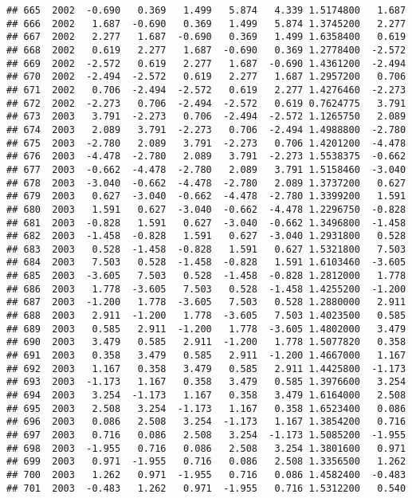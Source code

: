 \documentclass[]{article}
\begin{document}
\begin{verbatim}
## 665  2002  -0.690   0.369   1.499   5.874   4.339 1.5174800   1.687
## 666  2002   1.687  -0.690   0.369   1.499   5.874 1.3745200   2.277
## 667  2002   2.277   1.687  -0.690   0.369   1.499 1.6358400   0.619
## 668  2002   0.619   2.277   1.687  -0.690   0.369 1.2778400  -2.572
## 669  2002  -2.572   0.619   2.277   1.687  -0.690 1.4361200  -2.494
## 670  2002  -2.494  -2.572   0.619   2.277   1.687 1.2957200   0.706
## 671  2002   0.706  -2.494  -2.572   0.619   2.277 1.4276460  -2.273
## 672  2002  -2.273   0.706  -2.494  -2.572   0.619 0.7624775   3.791
## 673  2003   3.791  -2.273   0.706  -2.494  -2.572 1.1265750   2.089
## 674  2003   2.089   3.791  -2.273   0.706  -2.494 1.4988800  -2.780
## 675  2003  -2.780   2.089   3.791  -2.273   0.706 1.4201200  -4.478
## 676  2003  -4.478  -2.780   2.089   3.791  -2.273 1.5538375  -0.662
## 677  2003  -0.662  -4.478  -2.780   2.089   3.791 1.5158460  -3.040
## 678  2003  -3.040  -0.662  -4.478  -2.780   2.089 1.3737200   0.627
## 679  2003   0.627  -3.040  -0.662  -4.478  -2.780 1.3399200   1.591
## 680  2003   1.591   0.627  -3.040  -0.662  -4.478 1.2296750  -0.828
## 681  2003  -0.828   1.591   0.627  -3.040  -0.662 1.3496800  -1.458
## 682  2003  -1.458  -0.828   1.591   0.627  -3.040 1.2931800   0.528
## 683  2003   0.528  -1.458  -0.828   1.591   0.627 1.5321800   7.503
## 684  2003   7.503   0.528  -1.458  -0.828   1.591 1.6103460  -3.605
## 685  2003  -3.605   7.503   0.528  -1.458  -0.828 1.2812000   1.778
## 686  2003   1.778  -3.605   7.503   0.528  -1.458 1.4255200  -1.200
## 687  2003  -1.200   1.778  -3.605   7.503   0.528 1.2880000   2.911
## 688  2003   2.911  -1.200   1.778  -3.605   7.503 1.4023500   0.585
## 689  2003   0.585   2.911  -1.200   1.778  -3.605 1.4802000   3.479
## 690  2003   3.479   0.585   2.911  -1.200   1.778 1.5077820   0.358
## 691  2003   0.358   3.479   0.585   2.911  -1.200 1.4667000   1.167
## 692  2003   1.167   0.358   3.479   0.585   2.911 1.4425800  -1.173
## 693  2003  -1.173   1.167   0.358   3.479   0.585 1.3976600   3.254
## 694  2003   3.254  -1.173   1.167   0.358   3.479 1.6164000   2.508
## 695  2003   2.508   3.254  -1.173   1.167   0.358 1.6523400   0.086
## 696  2003   0.086   2.508   3.254  -1.173   1.167 1.3854200   0.716
## 697  2003   0.716   0.086   2.508   3.254  -1.173 1.5085200  -1.955
## 698  2003  -1.955   0.716   0.086   2.508   3.254 1.3801600   0.971
## 699  2003   0.971  -1.955   0.716   0.086   2.508 1.3356500   1.262
## 700  2003   1.262   0.971  -1.955   0.716   0.086 1.4582400  -0.483
## 701  2003  -0.483   1.262   0.971  -1.955   0.716 1.5312200   0.540

\end{verbatim}
\end{document}
